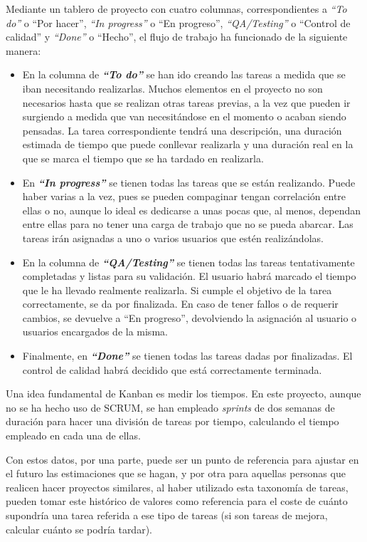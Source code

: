 Mediante un tablero de proyecto con cuatro columnas, correspondientes a \textit{``To do''} o ``Por hacer'', \textit{``In progress''} o ``En progreso'', \textit{``QA/Testing''} o ``Control de calidad'' y \textit{``Done''} o ``Hecho'', el flujo de trabajo ha funcionado de la siguiente manera:
\begin{itemize}
\tightlist
    \item En la columna de \textbf{\textit{``To do''}} se han ido creando las tareas a medida que se iban necesitando realizarlas. Muchos elementos en el proyecto no son necesarios hasta que se realizan otras tareas previas, a la vez que pueden ir surgiendo a medida que van necesitándose en el momento o acaban siendo pensadas. La tarea correspondiente tendrá una descripción, una duración estimada de tiempo que puede conllevar realizarla y una duración real en la que se marca el tiempo que se ha tardado en realizarla.
    \item En \textbf{\textit{``In progress''}} se tienen todas las tareas que se están realizando. Puede haber varias a la vez, pues se pueden compaginar tengan correlación entre ellas o no, aunque lo ideal es dedicarse a unas pocas que, al menos, dependan entre ellas para no tener una carga de trabajo que no se pueda abarcar. Las tareas irán asignadas a uno o varios usuarios que estén realizándolas.
    \item En la columna de \textbf{\textit{``QA/Testing''}} se tienen todas las tareas tentativamente completadas y listas para su validación. El usuario habrá marcado el tiempo que le ha llevado realmente realizarla. Si cumple el objetivo de la tarea correctamente, se da por finalizada. En caso de tener fallos o de requerir cambios, se devuelve a ``En progreso'', devolviendo la asignación al usuario o usuarios encargados de la misma.
    \item Finalmente, en \textbf{\textit{``Done''}} se tienen todas las tareas dadas por finalizadas. El control de calidad habrá decidido que está correctamente terminada.
\end{itemize}

Una idea fundamental de Kanban es medir los tiempos. En este proyecto, aunque no se ha hecho uso de SCRUM, se han empleado \textit{sprints} de dos semanas de duración para hacer una división de tareas por tiempo, calculando el tiempo empleado en cada una de ellas. 

Con estos datos, por una parte, puede ser un punto de referencia para ajustar en el futuro las estimaciones que se hagan, y por otra para aquellas personas que realicen hacer proyectos similares, al haber utilizado esta taxonomía de tareas, pueden tomar este histórico de valores como referencia para el coste de cuánto supondría una tarea referida a ese tipo de tareas (si son tareas de mejora, calcular cuánto se podría tardar).

